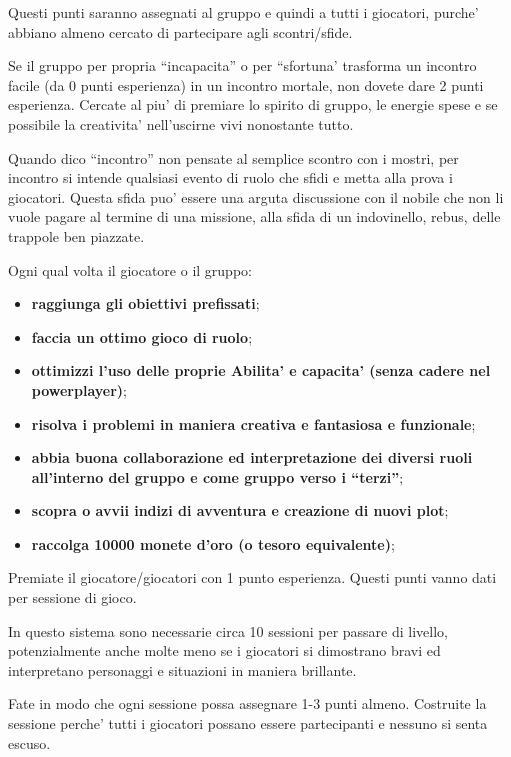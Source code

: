 \documentclass[a4paper,11pt,twoside,openany]{dndbook}
\begin{document}
{Questi punti saranno assegnati al gruppo e quindi a tutti i giocatori, purche' abbiano almeno cercato di partecipare agli scontri/sfide.

Se il gruppo per propria ``incapacita'' o per ``sfortuna' trasforma un incontro facile (da 0 punti esperienza) in un incontro mortale, non dovete dare 2 punti esperienza. Cercate al piu' di premiare lo spirito di gruppo, le energie spese e se possibile la creativita' nell'uscirne vivi  nonostante tutto.

Quando dico ``incontro'' non pensate al semplice scontro con i mostri, per incontro si intende qualsiasi evento di ruolo che sfidi e metta alla prova i giocatori. Questa sfida puo' essere una arguta discussione con il nobile che non li vuole pagare al termine di una missione, alla sfida di un indovinello, rebus, delle trappole ben piazzate.

\bigskip

Ogni qual volta il giocatore o il gruppo:
\begin{itemize}
\item 
\textbf{raggiunga gli obiettivi prefissati}; 
\item 
\textbf{faccia un ottimo gioco di ruolo}; 
\item 
\textbf{ottimizzi l'uso delle proprie Abilita' e capacita' (senza cadere nel powerplayer)}; 
\item 
\textbf{risolva i problemi in maniera creativa e fantasiosa e funzionale}; 
\item 
\textbf{abbia buona collaborazione ed interpretazione dei diversi ruoli all'interno del gruppo e come gruppo verso i ``terzi''}; 
\item 
\textbf{scopra o avvii indizi di avventura e creazione di nuovi plot};
\item
\textbf{raccolga 10000 monete d'oro (o tesoro equivalente)};
\end{itemize}

\bigskip

Premiate il giocatore/giocatori con 1 punto esperienza. Questi punti vanno dati per sessione di gioco.

In questo sistema sono necessarie circa 10 sessioni per passare di livello, potenzialmente anche molte meno se i giocatori si dimostrano bravi ed interpretano personaggi e situazioni in maniera brillante. 

Fate in modo che ogni sessione possa assegnare 1-3 punti almeno. Costruite la sessione perche' tutti i giocatori possano essere partecipanti e nessuno si senta escuso.

}
\end{document}
